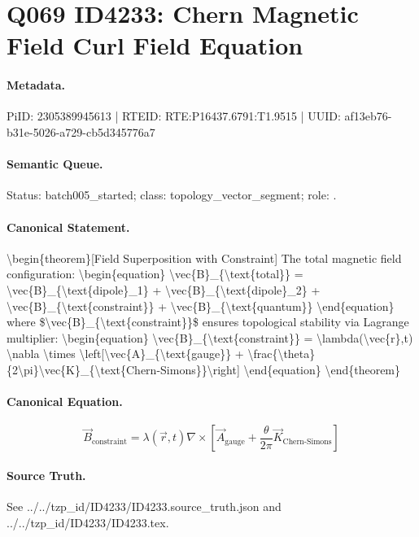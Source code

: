 \section*{Q069 ID4233: Chern Magnetic Field Curl Field Equation}
\paragraph{Metadata.}
PiID: 2305389945613 | RTEID: RTE:P16437.6791:T1.9515 | UUID: af13eb76-b31e-5026-a729-cb5d345776a7

\paragraph{Semantic Queue.}
Status: batch005\_started; class: topology\_vector\_segment; role: .

\paragraph{Canonical Statement.}
\textbackslash{}begin\{theorem\}[Field Superposition with Constraint] The total magnetic field configuration: \textbackslash{}begin\{equation\} \textbackslash{}vec\{B\}\_\{\textbackslash{}text\{total\}\} = \textbackslash{}vec\{B\}\_\{\textbackslash{}text\{dipole\}\_1\} + \textbackslash{}vec\{B\}\_\{\textbackslash{}text\{dipole\}\_2\} + \textbackslash{}vec\{B\}\_\{\textbackslash{}text\{constraint\}\} + \textbackslash{}vec\{B\}\_\{\textbackslash{}text\{quantum\}\} \textbackslash{}end\{equation\} where \$\textbackslash{}vec\{B\}\_\{\textbackslash{}text\{constraint\}\}\$ ensures topological stability via Lagrange multiplier: \textbackslash{}begin\{equation\} \textbackslash{}vec\{B\}\_\{\textbackslash{}text\{constraint\}\} = \textbackslash{}lambda(\textbackslash{}vec\{r\},t) \textbackslash{}nabla \textbackslash{}times \textbackslash{}left[\textbackslash{}vec\{A\}\_\{\textbackslash{}text\{gauge\}\} + \textbackslash{}frac\{\textbackslash{}theta\}\{2\textbackslash{}pi\}\textbackslash{}vec\{K\}\_\{\textbackslash{}text\{Chern-Simons\}\}\textbackslash{}right] \textbackslash{}end\{equation\} \textbackslash{}end\{theorem\}

\paragraph{Canonical Equation.}
\[
\begin{equation} \vec{B}_{\text{constraint}} = \lambda(\vec{r},t) \nabla \times \left[\vec{A}_{\text{gauge}} + \frac{\theta}{2\pi}\vec{K}_{\text{Chern-Simons}}\right] \end{equation}
\]

\paragraph{Source Truth.}
See ../../tzp\_id/ID4233/ID4233.source\_truth.json and ../../tzp\_id/ID4233/ID4233.tex.
